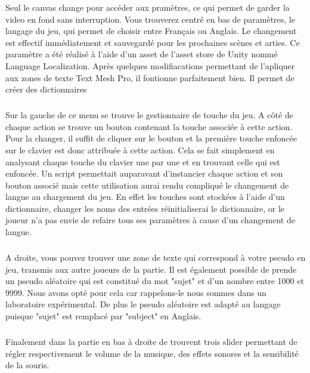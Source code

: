 \documentclass{article}
\begin{document}
Seul le canvas change pour accéder aux pramètres, ce qui permet de garder la video en fond sans interruption.
Vous trouverez centré en bas de paramètres, le langage du jeu, qui permet de choisir entre Français ou Anglais. Le changement est effectif immédiatement et sauvegardé pour les prochaines scènes et arties. Ce paramètre a été réalisé à l'aide d'un asset de l'asset store de Unity nommé Language Localization. Après quelques modifiacations permettant de l'apliquer aux zones de texte Text Mesh Pro, il fontionne parfaitement bien. Il permet de créer des dictionnaires
\subparagraph{}
Sur la gauche de ce menu se trouve le gestionnaire de touche du jeu. A côté de chaque action se trouve un bouton contenant la touche associée à cette action. Pour la changer, il suffit de cliquer sur le bouton et la première touche enfoncée sur le clavier est donc attribuée à cette action. Cela se fait simplement en analysant chaque touche du clavier une par une et en trouvant celle qui est enfoncée. Un script permettait auparavant d'instancier chaque action et son bouton associé mais cette utilisation aurai rendu compliqué le changement de langue au chargement du jeu. En effet les touches sont stockées à l'aide d'un dictionnaire, changer les noms des entrées réinitialiserai le dictionnaire, or le joueur n'a pas envie de refaire tous ses paramètres à cause d'un changement de langue.

\subparagraph{}
A droite, vous pouvez trouver une zone de texte qui correspond à votre pseudo en jeu, transmis aux autre joueurs de la partie. Il est également possible de prende un pseudo aléatoire qui est constitué du mot "sujet" et d'un nombre entre 1000 et 9999. Nous avons opté pour cela car rappelons-le nous sommes dans un laboratoire expérimental. De plus le pseudo aléatoire est adapté au langage puisque "sujet" est remplacé par "subject" en Anglais.

\subparagraph{}
Finalement dans la partie en bas à droite de trouvent trois slider permettant de régler respectivement le volume de la musique, des effets sonores et la sensibilité de la souris.
\end{document}
